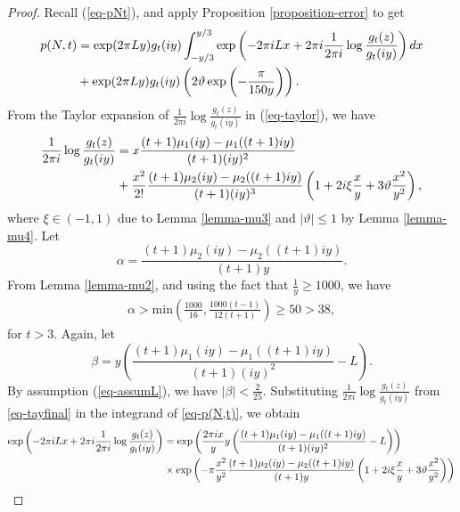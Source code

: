\documentclass[11pt]{amsart}
\theoremstyle{plain}
\numberwithin{equation}{section}
\begin{document}
		\begin{proof}
			Recall (\ref{eq-pNt}), and apply Proposition \ref{proposition-error} to get
			\begin{align}\label{eq-p(N,t)}
				\notag
				p(N,t)&=\exp(2\pi Ly)g_{t}(iy)\int_{-y/3}^{y/3}\exp\left(-2\pi i Lx+2\pi i\frac{1}{2\pi i}\log\frac{g_{t}(z)}{g_{t}(iy)}\right)dx\\
				&+\exp(2\pi Ly)g_{t}(iy)\left(2\vartheta\exp\left(-\frac{\pi}{150y}\right)\right).
			\end{align}
			From the Taylor expansion of $\frac{1}{2\pi i}\log\frac{g_t(z)}{g_t(iy)}$ in (\ref{eq-taylor}), we have
			\begin{align}\label{eq-tayfinal}
				\notag
				\frac{1}{2\pi i}\log \frac{g_{t}(z)}{g_{t}(iy)}&=x\frac{(t+1)\mu_{1}(iy)-\mu_{1}((t+1)iy)}{(t+1)(iy)^{2}}\\
				&+\frac{x^{2}}{2!}\frac{(t+1)\mu_{2}(iy)-\mu_{2}((t+1)iy)}{(t+1)(iy)^{3}}\left(1+2i\xi\frac{x}{y}+3\vartheta \frac{x^{2}}{y^{2}}\right),
			\end{align}
			where $\xi\in (-1,1)$ due to Lemma \ref{lemma-mu3} and $|\vartheta|\le 1$ by Lemma \ref{lemma-mu4}.
			\newline
			Let 
			\begin{equation}\label{eq-alpha}
				\alpha=\frac{(t+1)\mu_{2}(iy)-\mu_{2}((t+1)iy)}{(t+1)y}.
			\end{equation}
			From Lemma \ref{lemma-mu2}, and using the fact that $\frac{1}{y}\ge 1000$, we have 
			\begin{align*}
				\alpha>\text{min}\left(\frac{1000}{16},\frac{1000(t-1)}{12(t+1)}\right)\ge 50>38,
			\end{align*}
			for $t>3$. 
			\newline
			Again, let 
			\begin{equation*}
				\beta=y\left(\frac{(t+1)\mu_{1}(iy)-\mu_{1}((t+1)iy)}{(t+1)(iy)^{2}}-L\right).   
			\end{equation*} 
			By assumption (\ref{eq-assumL}), we have $|\beta|<\frac{2}{25}.$ Substituting $\frac{1}{2\pi i}\log\frac{g_t(z)}{g_t(iy)}$ from \eqref{eq-tayfinal} in the integrand of \eqref{eq-p(N,t)}, we obtain
			\begin{align}\label{eq-exppart}
				\notag
				\exp\left(-2\pi i Lx+2\pi i\frac{1}{2\pi i}\log\frac{g_{t}(z)}{g_{t}(iy)}\right)&=\exp\left(\frac{2\pi ix}{y}y\left(\frac{(t+1)\mu_{1}(iy)-\mu_{1}((t+1)iy)}{(t+1)(iy)^{2}}-L\right)\right)\\
				\notag
				&\times\exp\left(-\pi\frac{x^{2}}{y^{2}}\frac{(t+1)\mu_{2}(iy)-\mu_{2}((t+1)iy)}{(t+1)y}\left(1+2i\xi\frac{x}{y}+3\vartheta \frac{x^{2}}{y^{2}}\right)\right)\\

\end{align}
\end{proof}
\end{document}
